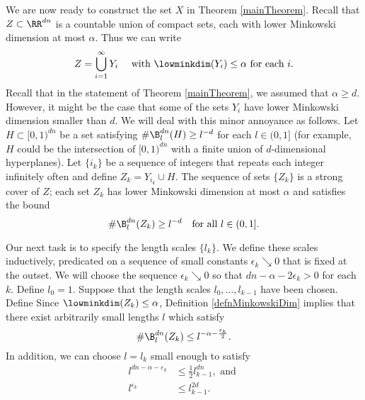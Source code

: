 We are now ready to construct the set $X$ in Theorem \ref{mainTheorem}. Recall that $Z \subset \RR^{dn}$ is a countable union of compact sets, each with lower Minkowski dimension at most $\alpha$. Thus we can write \[ Z =  \bigcup_{i=1}^{\infty} Y_i  \quad \text{ with }  \lowminkdim(Y_i) \leq \alpha  \text{ for each $i$}. \]  Recall that in the statement of Theorem \ref{mainTheorem}, we assumed that $\alpha\geq d$. However, it might be the case that some of the sets $Y_i$ have lower Minkowski dimension smaller than $d$. We will deal with this minor annoyance as follows. Let $H\subset[0,1)^{dn}$ be a set satisfying $\#\B_{l}^{dn}(H)\geq l^{-d}$ for each $l\in (0,1]$ (for example, $H$ could be the intersection of $[0,1)^{dn}$ with a finite union of $d$-dimensional hyperplanes). Let $\{i_k\}$ be a sequence of integers that repeats each integer infinitely often and define $Z_k = Y_{i_k}\cup H.$ The sequence of sets $\{Z_k\}$ is a strong cover of $Z$; each set $Z_k$ has lower Minkowski dimension at most $\alpha$ and satisfies the bound 
\begin{equation}\label{lowerBoundZk}
\#\B_{l}^{dn}(Z_k)\geq l^{-d}\quad\textrm{for all}\ l\in (0,1].
\end{equation}

Our next task is to specify the length scales $\{l_k\}$. We define these scales inductively, predicated on a sequence of small constants $\epsilon_k \searrow 0$ that is fixed at the outset. We will choose the sequence $\epsilon_k \searrow 0$ so that $dn-\alpha-2\epsilon_k>0$ for each $k$. Define $l_0=1$. Suppose that the length scales $l_0,\ldots,l_{k-1}$ have been chosen. Define
Since $\lowminkdim(Z_k) \leq \alpha$, Definition \ref{defnMinkowskiDim} implies that there exist arbitrarily small lengths $l$ which satisfy 
\begin{equation}\label{coveringOfBdnlZk}
\# \B^{dn}_l(Z_k) \leq l^{-\alpha - \frac{\varepsilon_k}{2}}.
\end{equation}
In addition, we can choose $l = l_k$ small enough to satisfy 
\begin{align}
l^{dn-\alpha-\varepsilon_k} & \leq \frac{1}{2}l_{k-1}^{dn}, \text{ and } \label{coverBoundRequirement}\\
l^{\epsilon_k} & \leq l_{k-1}^{2d}\label{quadDecayRequirement}.
\end{align}

